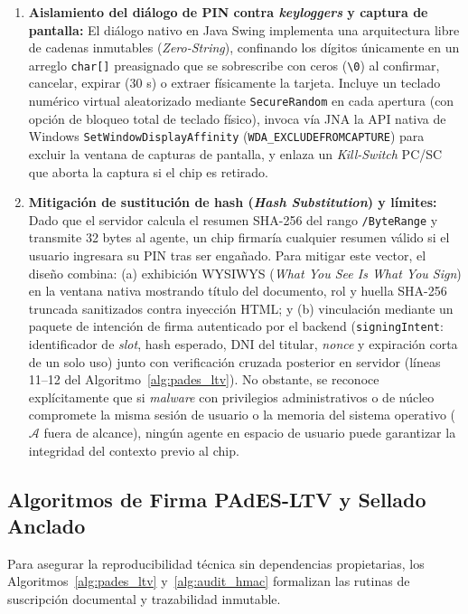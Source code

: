 \documentclass[runningheads,twocolumn]{llncs}
\begin{document}
\begin{enumerate}
    \item \textbf{Aislamiento del diálogo de PIN contra \textit{keyloggers} y captura de pantalla:} El diálogo nativo en Java Swing implementa una arquitectura libre de cadenas inmutables (\textit{Zero-String}), confinando los dígitos únicamente en un arreglo \texttt{char[]} preasignado que se sobrescribe con ceros (\texttt{\textbackslash0}) al confirmar, cancelar, expirar (30 s) o extraer físicamente la tarjeta. Incluye un teclado numérico virtual aleatorizado mediante \texttt{SecureRandom} en cada apertura (con opción de bloqueo total de teclado físico), invoca vía JNA la API nativa de Windows \texttt{SetWindowDisplayAffinity} (\texttt{WDA\_EXCLUDEFROMCAPTURE}) para excluir la ventana de capturas de pantalla, y enlaza un \textit{Kill-Switch} PC/SC que aborta la captura si el chip es retirado.
    \item \textbf{Mitigación de sustitución de hash (\textit{Hash Substitution}) y límites:} Dado que el servidor calcula el resumen SHA-256 del rango \texttt{/ByteRange} y transmite 32 bytes al agente, un chip firmaría cualquier resumen válido si el usuario ingresara su PIN tras ser engañado. Para mitigar este vector, el diseño combina: (a) exhibición WYSIWYS (\textit{What You See Is What You Sign}) en la ventana nativa mostrando título del documento, rol y huella SHA-256 truncada sanitizados contra inyección HTML; y (b) vinculación mediante un paquete de intención de firma autenticado por el backend (\texttt{signingIntent}: identificador de \textit{slot}, hash esperado, DNI del titular, \textit{nonce} y expiración corta de un solo uso) junto con verificación cruzada posterior en servidor (líneas 11--12 del Algoritmo~\ref{alg:pades_ltv}). No obstante, se reconoce explícitamente que si \textit{malware} con privilegios administrativos o de núcleo compromete la misma sesión de usuario o la memoria del sistema operativo ($\mathcal{A}$ fuera de alcance), ningún agente en espacio de usuario puede garantizar la integridad del contexto previo al chip.
\end{enumerate}

\subsection{Algoritmos de Firma PAdES-LTV y Sellado Anclado}\label{sec:algorithms}
Para asegurar la reproducibilidad técnica sin dependencias propietarias, los Algoritmos~\ref{alg:pades_ltv} y~\ref{alg:audit_hmac} formalizan las rutinas de suscripción documental y trazabilidad inmutable.
\end{document}
